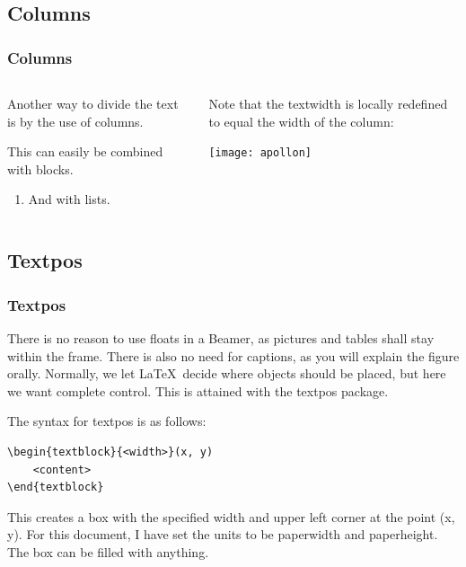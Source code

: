 \documentclass[UKenglish, unknownkeysallowed]{beamer}
\begin{document}
\subsection{Columns}


\begin{frame}
    \frametitle{Columns}

    \begin{columns}[onlytextwidth]
        \begin{column}{0.49\textwidth}
            Another way to divide the text is by the use of \alert{columns}.

            \begin{example}
                This can easily be combined with \alert{blocks}.
            \end{example}

            \begin{enumerate}
                \item
                And with \alert{lists}.
            \end{enumerate}
        \end{column}

        \begin{column}{0.49\textwidth}
            Note that the textwidth is locally redefined to equal the width of the column:
            \begin{center}
                \texttt{[image: apollon]}
            \end{center}
        \end{column}
    \end{columns}
\end{frame}


\subsection{Textpos}


\begin{frame}[fragile]
    \frametitle{Textpos}

    There is no reason to use floats in a Beamer,
    as pictures and tables shall stay within the frame.
    There is also no need for captions,
    as you will explain the figure orally.
    Normally, we let \LaTeX\ decide where objects should be placed,
    but here we want complete control.
    This is attained with the \alert{textpos} package.

    \medskip

    The syntax for textpos is as follows:

\begin{lstlisting}[language = {[LaTeX]{TeX}}]
\begin{textblock}{<width>}(x, y)
    <content>
\end{textblock}
\end{lstlisting}

    This creates a box with the specified width and upper left corner at the point (x, y).
    For this document, I have set the units to be paperwidth and paperheight.
    The box can be filled with anything.
\end{frame}
\end{document}
